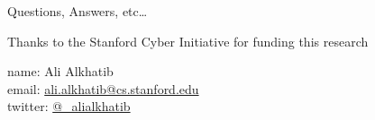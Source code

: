 \documentclass[presentation]{subfiles}
\begin{document}
  \begin{frame}{Questions, Answers, etc\dots}

      Thanks to the Stanford Cyber Initiative for funding this research

  
      name: {Ali Alkhatib} \\
      email: \href{mailto:ali.alkhatib@cs.stanford.edu}{ali.alkhatib@cs.stanford.edu} \\
      twitter: \href{https://twitter.com/_alialkhatib}{@\_alialkhatib} \\
  \end{frame}
\end{document}
